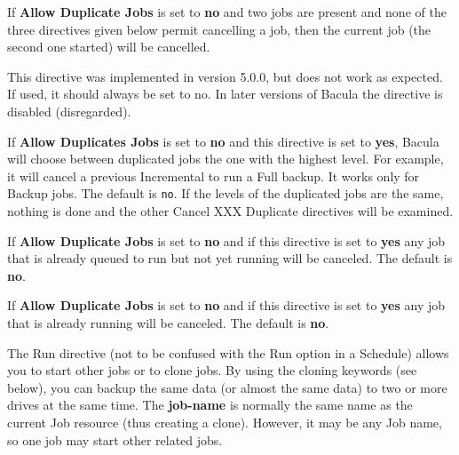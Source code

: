 \begin{description}
  If {\bf Allow Duplicate Jobs} is set to {\bf no} and two jobs
  are present and none of the three directives given below permit
  cancelling a job, then the current job (the second one started)
  will be cancelled.

\item [Allow Higher Duplicates = \lt{}yes\vb{}no\gt{}]
  This directive was implemented in version 5.0.0, but does not work
  as expected. If used, it should always be set to no.  In later versions
  of Bacula the directive is disabled (disregarded).


\item [Cancel Lower Level Duplicates = \lt{}yes\vb{}no\gt{}]
  If \textbf{Allow Duplicates Jobs} is set to \textbf{no} and this
  directive is set to \textbf{yes}, Bacula will choose between duplicated
  jobs the one with the highest level.  For example, it will cancel a
  previous Incremental to run a Full backup.  It works only for Backup
  jobs.  The default is \texttt{no}. If the levels of the duplicated
  jobs are the same, nothing is done and the other
  Cancel XXX Duplicate directives will be examined.

\item [Cancel Queued Duplicates = \lt{}yes\vb{}no\gt{}]
  If {\bf Allow Duplicate Jobs} is set to {\bf no} and
  if this directive is set to {\bf yes} any job that is
  already queued to run but not yet running will be canceled.
  The default is {\bf no}. 

\item[Cancel Running Duplicates = \lt{}yes\vb{}no\gt{}]
  If {\bf Allow Duplicate Jobs} is set to {\bf no} and
  if this directive is set to {\bf yes} any job that is already running
  will be canceled.  The default is {\bf no}.



\item [Run = \lt{}job-name\gt{}]
   The Run directive (not to be confused with the Run option in a 
   Schedule) allows you to start other jobs or to clone jobs. By using the
   cloning keywords (see below), you can backup
   the same data (or almost the same data) to two or more drives
   at the same time. The {\bf job-name} is normally the same name
   as the current Job resource (thus creating a clone). However, it
   may be any Job name, so one job may start other related jobs.


\end{description}
